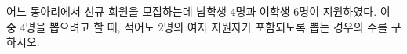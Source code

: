 \hspace*{2mm}\begin{minipage}[t]{\dimexpr\linewidth-2mm\relax}\vspace{0pt}
어느 동아리에서 신규 회원을 모집하는데 남학생 $4$명과 여학생 $6$명이 지원하였다. 이 중 $4$명을 뽑으려고 할 때, 적어도 $2$명의 여자 지원자가 포함되도록 뽑는 경우의 수를 구하시오.\end{minipage}
